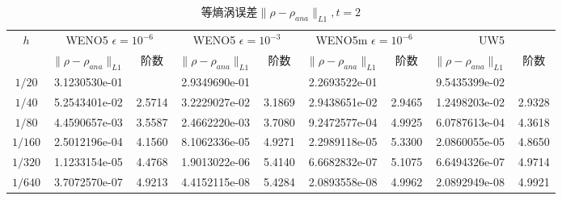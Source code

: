 \documentclass[UTF8,zihao=5]{ctexart} %
\begin{document}
\begin{table}[H]
    \footnotesize
    \begin{center}
        \caption{等熵涡误差$\|\rho-\rho_{ana}\|_{L1}, t=2$} %
        \begin{tabular}{|c|c|c|c|c|c|c|c|c|}
            \hline
            \multirow{2}{*}{$h$} & \multicolumn{2}{|c|}{WENO5 $\epsilon=10^{-6}$} & \multicolumn{2}{|c|}{WENO5 $\epsilon=10^{-3}$} & \multicolumn{2}{|c|}{WENO5m $\epsilon=10^{-6}$} & \multicolumn{2}{|c|}{UW5}                                                                             \\
            \cline{2-9}
                                 & $\|\rho-\rho_{ana}\|_{L1}$                     & 阶数                                           & $\|\rho-\rho_{ana}\|_{L1}$                      & 阶数                      & $\|\rho-\rho_{ana}\|_{L1}$ & 阶数   & $\|\rho-\rho_{ana}\|_{L1}$ & 阶数   \\
            \hline
            $1/20$               & 3.1230530e-01                                  &                                                & 2.9349690e-01                                   &                           & 2.2693522e-01              &        & 9.5435399e-02              &        \\
            \hline
            $1/40$               & 5.2543401e-02                                  & 2.5714                                         & 3.2229027e-02                                   & 3.1869                    & 2.9438651e-02              & 2.9465 & 1.2498203e-02              & 2.9328 \\
            \hline
            $1/80$               & 4.4590657e-03                                  & 3.5587                                         & 2.4662220e-03                                   & 3.7080                    & 9.2472577e-04              & 4.9925 & 6.0787613e-04              & 4.3618 \\
            \hline
            $1/160$              & 2.5012196e-04                                  & 4.1560                                         & 8.1062336e-05                                   & 4.9271                    & 2.2989118e-05              & 5.3300 & 2.0860055e-05              & 4.8650 \\
            \hline
            $1/320$              & 1.1233154e-05                                  & 4.4768                                         & 1.9013022e-06                                   & 5.4140                    & 6.6682832e-07              & 5.1075 & 6.6494326e-07              & 4.9714 \\
            \hline
            $1/640$              & 3.7072570e-07                                  & 4.9213                                         & 4.4152115e-08                                   & 5.4284                    & 2.0893558e-08              & 4.9962 & 2.0892949e-08              & 4.9921 \\
            \hline
        \end{tabular}
    \end{center}
\end{table}
\end{document}
